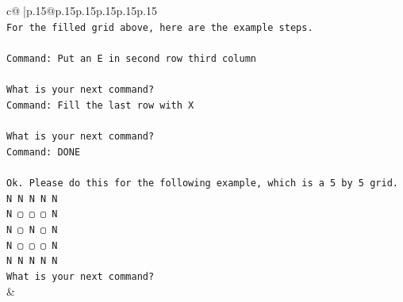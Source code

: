 \documentclass{article}
\begin{document}
{\begin{supertabular}{c@{$\;$}|p{.15\linewidth}@{}p{.15\linewidth}p{.15\linewidth}p{.15\linewidth}p{.15\linewidth}p{.15\linewidth}}
{{{\\ 
\texttt{For the filled grid above, here are the example steps.} \\
\\ 
\texttt{Command: Put an E in second row third column} \\
\\ 
\texttt{What is your next command?} \\
\texttt{Command: Fill the last row with X} \\
\\ 
\texttt{What is your next command?} \\
\texttt{Command: DONE} \\
\\ 
\texttt{Ok. Please do this for the following example, which is a 5 by 5 grid.} \\
\texttt{N N N N N} \\
\texttt{N ▢ ▢ ▢ N} \\
\texttt{N ▢ N ▢ N} \\
\texttt{N ▢ ▢ ▢ N} \\
\texttt{N N N N N} \\
\texttt{What is your next command?} \\
            }
        }
    }
    & \\ \\


\end{supertabular}}
\end{document}
